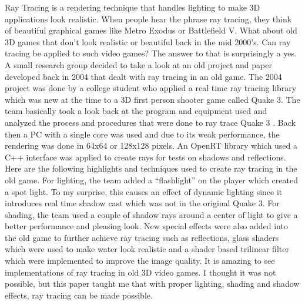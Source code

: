 \documentclass{article}
\begin{document}
Ray Tracing is a rendering technique that handles lighting to make 3D applications look realistic. When people hear the phrase ray tracing, they think of beautiful graphical games like Metro Exodus or Battlefield V. What about old 3D games that don’t look realistic or beautiful back in the mid 2000’s. Can ray tracing be applied to such video games? The answer to that is surprisingly a yes. A small research group decided to take a look at an old project and paper developed back in 2004 that dealt with ray tracing in an old game. The 2004 project was done by a college student who applied a real time ray tracing library which was new at the time to a 3D first person shooter game called Quake 3. The team basically took a look back at the program and equipment used and analyzed the process and procedures that were done to ray trace Quake 3 \cite{9222984}. Back then a PC with a single core was used and due to its weak performance, the rendering was done in 64x64 or 128x128 pixels. An OpenRT library which used a C++ interface was applied to create rays for tests on shadows and reflections. Here are the following highlights and techniques used to create ray tracing in the old game. For lighting, the team added a “flashlight” on the player which created a spot light. To my surprise, this causes an effect of dynamic lighting since it introduces real time shadow cast which was not in the original Quake 3. For shading, the team used a couple of shadow rays around a center of light to give a better performance and pleasing look. New special effects were also added into the old game to further achieve ray tracing such as reflections, glass shaders which were used to make water look realistic and a shader based trilinear filter which were implemented to improve the image quality. It is amazing to see implementations of ray tracing in old 3D video games. I thought it was not possible, but this paper taught me that with proper lighting, shading and shadow effects, ray tracing can be made possible.
  
\end{document}
